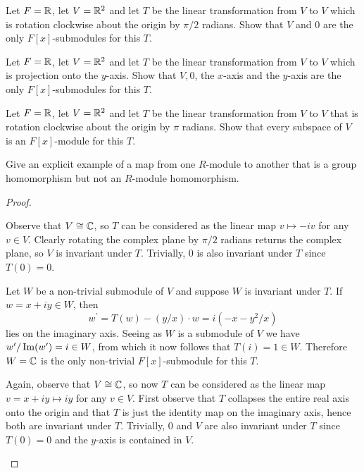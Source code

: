 \documentclass[10pt]{amsart}
\begin{document}
\begin{thm}
  \label{Ex5}
  \begin{alphaenum}
    \item
      Let $F=\mathbb{R}$, let $V = \mathbb{R}^2$ and let $T$ be the linear transformation from $V$ to $V$ which is rotation clockwise about the origin by $\pi/2$ radians.
      Show that $V$ and $0$ are the only $F[x]$-submodules for this $T$.
    \item
      Let $F=\mathbb{R}$, let $V = \mathbb{R}^2$ and let $T$ be the linear transformation from $V$ to $V$ which is projection onto the $y$-axis.
      Show that $V,0$, the $x$-axis and the $y$-axis are the only $F[x]$-submodules for this $T$.
    \item
      Let $F = \mathbb{R}$, let $V = \mathbb{R}^2$ and let $T$ be the linear transformation from $V$ to $V$ that is rotation clockwise about the origin by $\pi$ radians.
      Show that every subspace of $V$ is an $F[x]$-module for this $T$.
    \item
      Give an explicit example of a map from one $R$-module to another that is a group homomorphism but not an $R$-module homomorphism.
    \end{alphaenum}
    \begin{proof}
      \begin{alphaenum}
      \item
        Observe that $V \cong \mathbb{C}$, so $T$ can be considered as the linear map $v \mapsto -iv$ for any $v \in V$.
        Clearly rotating the complex plane by $\pi/2$ radians returns the complex plane, so $V$ is invariant under $T$.
        Trivially, $0$ is also invariant under $T$ since $T(0) = 0$.

        Let $W$ be a non-trivial submodule of $V$ and suppose $W$ is invariant under $T$. 
        If $w = x + iy \in W$, then $$w^{\prime} = T(w) - (y/x)\cdot w = i(-x - y^2/x)$$ lies on the imaginary axis.
        Seeing as $W$ is a submodule of $V$ we have $w^{\prime}/\operatorname{Im}(w^{\prime}) = i \in W$, from which it now follows that $T(i) = 1 \in W$.
        Therefore $W = \mathbb{C}$ is the only non-trivial $F[x]$-submodule for this $T$.
      \item
        Again, observe that $V \cong \mathbb{C}$, so now $T$ can be considered as the linear map $v = x+iy \mapsto iy$ for any $v \in V$.
        First observe that $T$ collapses the entire real axis onto the origin and that $T$ is just the identity map on the imaginary axis, hence both are invariant under $T$.
        Trivially, $0$ and $V$ are also invariant under $T$ since $T(0) = 0$ and the $y$-axis is contained in $V$.
        

\end{alphaenum}
\end{proof}
\end{thm}
\end{document}
